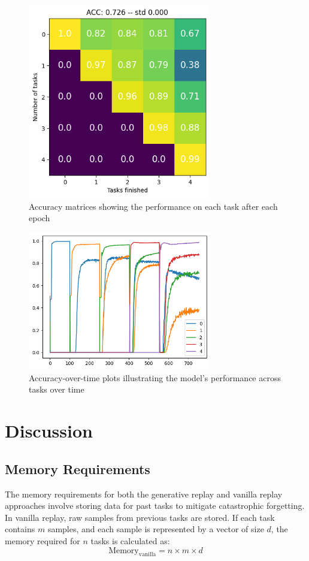 \documentclass{article}
\begin{document}
\begin{figure}[h!]
\centering
\includegraphics[width=8cm]{imgs/gan1.png}
\caption{Accuracy matrices showing the performance on each task after each epoch}
\label{fig:3}
\end{figure}
\begin{figure}[h!]
\centering
\includegraphics[width=8cm]{imgs/gan2.png}
\caption{Accuracy-over-time plots illustrating the model's performance across tasks over time}
\label{fig:4}
\end{figure}




\section{Discussion}

\subsection{Memory Requirements}
The memory requirements for both the generative replay and vanilla replay approaches involve storing data for past tasks to mitigate catastrophic forgetting. In vanilla replay, raw samples from previous tasks are stored. If each task contains \(m\) samples, and each sample is represented by a vector of size \(d\), the memory required for \(n\) tasks is calculated as:
\[
\text{Memory}_{\text{vanilla}} = n \times m \times d
\]
\end{document}
